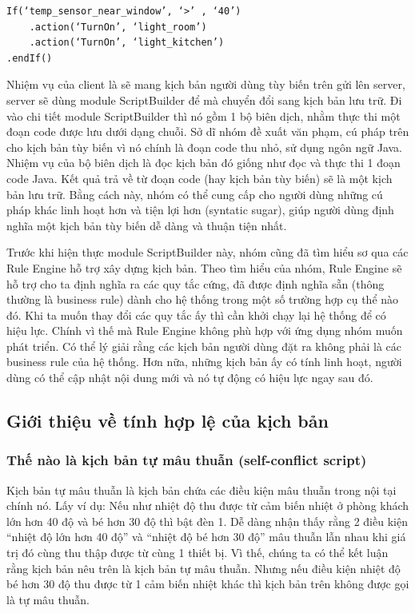 \documentclass[12pt,a4paper,oneside]{extbook}
\begin{document}
\begin{verbatim}
If(‘temp_sensor_near_window’, ‘>’ , ‘40’)
	.action(‘TurnOn’, ‘light_room’)
	.action(‘TurnOn’, ‘light_kitchen’)
.endIf()
\end{verbatim}

Nhiệm vụ của client là sẽ mang kịch bản người dùng tùy biến trên gửi lên server, server sẽ dùng module ScriptBuilder để mà chuyển đổi sang kịch bản lưu trữ. Đi vào chi tiết module ScriptBuilder thì nó gồm 1 bộ biên dịch, nhằm thực thi một đoạn code được lưu dưới dạng chuỗi. Sở dĩ nhóm đề xuất văn phạm, cú pháp trên cho kịch bản tùy biến vì nó chính là đoạn code thu nhỏ, sử dụng ngôn ngữ Java. Nhiệm vụ của bộ biên dịch là đọc kịch bản đó giống như đọc và thực thi 1 đoạn code Java. Kết quả trả về từ đoạn code (hay kịch bản tùy biến) sẽ là một kịch bản lưu trữ. Bằng cách này, nhóm có thể cung cấp cho người dùng những cú pháp khác linh hoạt hơn và tiện lợi hơn (syntatic sugar), giúp người dùng định nghĩa một kịch bản tùy biến dễ dàng và thuận tiện nhất.

Trước khi hiện thực module ScriptBuilder này, nhóm cũng đã tìm hiểu sơ qua các Rule Engine hỗ trợ xây dựng kịch bản. Theo tìm hiểu của nhóm, Rule Engine sẽ hỗ trợ cho ta định nghĩa ra các quy tắc cứng, đã được định nghĩa sẵn (thông thường là business rule) dành cho hệ thống trong một số trường hợp cụ thể nào đó. Khi ta muốn thay đổi các quy tắc ấy thì cần khởi chạy lại hệ thống để có hiệu lực. Chính vì thế mà Rule Engine không phù hợp với ứng dụng nhóm muốn phát triển. Có thể lý giải rằng các kịch bản người dùng đặt ra không phải là các business rule của hệ thống. Hơn nữa, những kịch bản ấy có tính linh hoạt, người dùng có thể cập nhật nội dung mới và nó tự động có hiệu lực ngay sau đó.

\subsection{Giới thiệu về tính hợp lệ của kịch bản}

\subsubsection{Thế nào là kịch bản tự mâu thuẫn (self-conflict script)}

Kịch bản tự mâu thuẫn là kịch bản chứa các điều kiện mâu thuẫn trong nội tại chính nó. Lấy ví dụ: Nếu như nhiệt độ thu được từ cảm biến nhiệt ở phòng khách lớn hơn 40 độ và bé hơn 30 độ thì bật đèn 1. Dễ dàng nhận thấy rằng 2 điều kiện “nhiệt độ lớn hơn 40 độ” và “nhiệt độ bé hơn 30 độ” mâu thuẫn lẫn nhau khi giá trị đó cùng thu thập được từ cùng 1 thiết bị. Vì thế, chúng ta có thể kết luận rằng kịch bản nêu trên là kịch bản tự mâu thuẫn. Nhưng nếu điều kiện nhiệt độ bé hơn 30 độ thu được từ 1 cảm biến nhiệt khác thì kịch bản trên không được gọi là tự mâu thuẫn.
\end{document}

